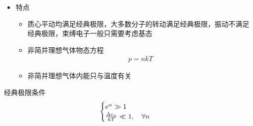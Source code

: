 \begin{itemize}
\begin{itemize}
\begin{itemize}
\begin{gather*}
                C_V^r = Nk
            \end{gather*}
            \item 低温极限
            \begin{gather*}
                Z^r \approx 1 + 3 \e^{-\frac{\hbar^2}{IkT}}
                \\
                \overline{\varepsilon}^r \approx 3 \frac{\hbar^2}{I} \e^{-\frac{\hbar^2}{IkT}}
                \\
                C_V^r \approx 3Nk \left(\frac{\hbar^2}{IkT}\right)^2 \e^{-\frac{\hbar^2}{IkT}}
            \end{gather*}
        \end{itemize}
        \item 振动
        \begin{gather*}
            \varepsilon_n^v = (n + \frac{1}{2}) h \nu, \quad n \in \mathbb{N}
            \\
            g_n^v = 1
            \\
            Z^v = \sum_{n=0}^{\infty} \e^{-\beta \varepsilon_n^v} = \frac{\e^{-\frac{1}{2} \beta h \nu}}{1 - \e^{-\beta h \nu}}
            \\
            \overline{\varepsilon}^v = \frac{h \nu}{\e^{\frac{h \nu}{k T}} - 1} + \frac{1}{2} h \nu
            \\
            C_V^v = Nk \left(\frac{h \nu}{k T}\right)^2 \frac{\e^{\frac{h \nu}{k T}}}{(\e^{\frac{h \nu}{k T}} - 1)^2}
        \end{gather*}
    \end{itemize}
    \item 特点
    \begin{itemize}
        \item 质心平动均满足经典极限，大多数分子的转动满足经典极限，振动不满足经典极限，束缚电子一般只需要考虑基态
        \item 非简并理想气体物态方程
        \begin{gather*}
            p = nkT
        \end{gather*}
        \item 非简并理想气体内能只与温度有关
    \end{itemize}
\end{itemize}

经典极限条件
\begin{gather*}
    \begin{cases}
        \mathrm{e}^{\alpha} \gg 1
        \\
        \frac{\Delta \varepsilon_n}{kT} \ll 1, \quad \forall n
    \end{cases}
\end{gather*}

